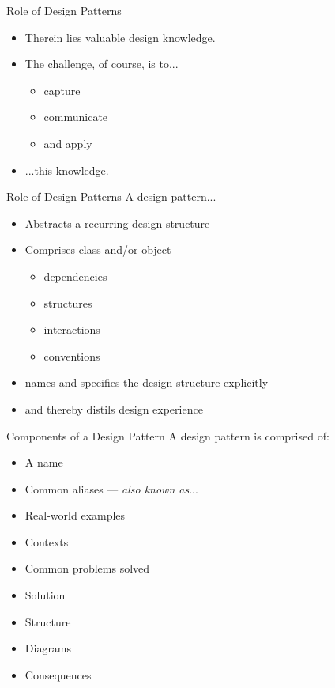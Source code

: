 \begin{frame}{Role of Design Patterns}
	\begin{itemize}
		\item Therein lies valuable design knowledge.
		\item The challenge, of course, is to...		
		\begin{itemize}
			\item capture
			\item communicate
			\item and apply
		\end{itemize}
		\item ...this knowledge.
	\end{itemize}
\end{frame}

\begin{frame}{Role of Design Patterns}
A design pattern...

	\begin{itemize}
		\item Abstracts a recurring design structure
		\item Comprises class and/or object	
		\begin{itemize}
			\item dependencies
			\item structures
			\item interactions
			\item conventions
		\end{itemize}
		\item names and specifies the design structure explicitly
		\item and thereby distils design experience
	\end{itemize}
\end{frame}

\begin{frame}{Components of a Design Pattern}
A design pattern is comprised of:

	\begin{itemize}
		\item A name
		\item Common aliases --- \textit{also known as}...	
		\item Real-world examples
		\item Contexts
		\item Common problems solved
		\item Solution
		\item Structure
		\item Diagrams
		\item Consequences
	\end{itemize}
\end{frame}


